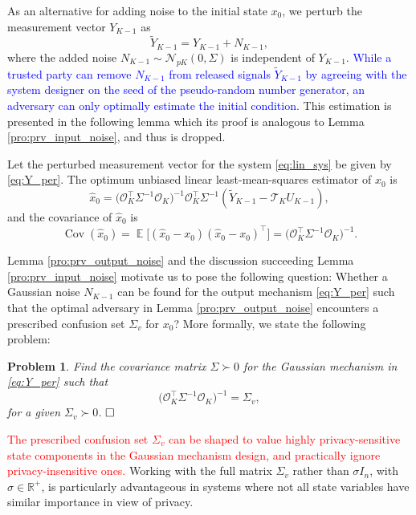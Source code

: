\documentclass{ifacconf}
\DeclareMathOperator{\Cov}{Cov}
\newcommand{\calN}{\ensuremath{\mathcal{N}}}
\newcommand{\calO}{\ensuremath{\mathcal{O}}}
\newcommand{\calT}{\ensuremath{\mathcal{T}}}
\newcommand{\R}{\ensuremath{\mathbb R}}
\DeclareMathOperator{\E}{\mathbb{E}}
\def\be{\begin{equation}}
\def\ee{\end{equation}}
\newcommand{\+}{\mathsmaller{+}}
\newcommand{\qedwhite}{\hfill \ensuremath{\Box}}
\newtheorem{problem}[thm]{Problem}
\newcommand{\blue}[1]{\textcolor{blue}{#1}}
\newcommand{\red}[1]{\textcolor{red}{#1}}
\begin{document}
As an alternative for adding noise to the initial state $x_0$, we perturb the measurement vector $Y_{K-1}$ as
\be\label{eq:Y_per}
\tilde{Y}_{K-1} = Y_{K-1} + N_{K-1} ,
\ee
where the added noise $N_{K-1}\sim\calN_{pK}(0,\Sigma)$ is independent of $Y_{K-1}$. \blue{While a trusted party can remove $N_{K-1}$ from released signals $\tilde{Y}_{K-1}$ by agreeing with the system designer on the seed of the pseudo-random number generator, an adversary can only optimally estimate the initial condition.} This estimation is presented in the following lemma which its proof is analogous to Lemma \ref{pro:prv_input_noise}, and thus is dropped. 
\begin{lem}\label{pro:prv_output_noise}
	Let the perturbed measurement vector for the system \eqref{eq:lin_sys} be given by \eqref{eq:Y_per}.
 The optimum unbiased linear least-mean-squares estimator of $x_0$ is
	\[
	\hat{x}_0 =
	\big(\calO_K^ \top \Sigma^{-1} \calO_K \big)^{-1}\calO_K^\top \Sigma^{-1}(\tilde{Y}_{K-1} - \calT_{K}U_{K-1}), 
	\]
	and the covariance of $\hat{x}_0$ is
	\[
	\Cov(\hat{x}_0) = \E\big[(\hat{x}_0 -x_0)(\hat{x}_0 - x_0)^\top\big] = 
	\big(\calO_K^ \top \Sigma^{-1} \calO_K \big)^{-1}.
	\]
\end{lem}
Lemma \ref{pro:prv_output_noise} and the discussion succeeding Lemma \ref{pro:prv_input_noise} motivate us to pose the following question: Whether a Gaussian noise $N_{K-1}$ can be found for the output mechanism \eqref{eq:Y_per} such that the optimal adversary in Lemma \ref{pro:prv_output_noise} encounters a prescribed confusion set $\Sigma_v$ for $x_0$?
More formally, we state the following problem: 
\setcounter{thm}{0}
\begin{problem}\label{prb:prob_1}
Find the covariance matrix $\Sigma \succ 0$ for the Gaussian mechanism in \eqref{eq:Y_per} such that 
\be\label{eq:des_prob}
\big(\calO_K^ \top \Sigma^{-1} \calO_K \big)^{-1} = \Sigma_v,
\ee
for a given $\Sigma_v \succ 0$. $\qedwhite$
\end{problem}
\setcounter{thm}{2}
\red{The prescribed confusion set $\Sigma_v$ can be shaped to value highly privacy-sensitive state components in the Gaussian mechanism design, and practically ignore privacy-insensitive ones.} Working with the full matrix $\Sigma_v$ rather than $\sigma I_n$, with $\sigma \in \R^{+}$, is particularly advantageous in systems where not all state variables have similar importance in view of privacy.
\end{document}
